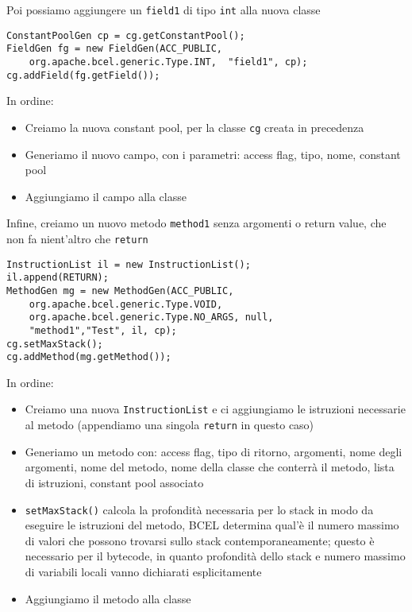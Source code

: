 Poi possiamo aggiungere un \texttt{field1} di tipo \texttt{int} alla nuova classe
\begin{verbatim}
ConstantPoolGen cp = cg.getConstantPool();
FieldGen fg = new FieldGen(ACC_PUBLIC,
    org.apache.bcel.generic.Type.INT,  "field1", cp);
cg.addField(fg.getField());
\end{verbatim}
In ordine:
\begin{itemize}
    \item Creiamo la nuova constant pool, per la classe \texttt{cg} creata in precedenza

    \item Generiamo il nuovo campo, con i parametri: access flag, tipo, nome, constant pool

    \item Aggiungiamo il campo alla classe
\end{itemize}

Infine, creiamo un nuovo metodo \texttt{method1} senza argomenti o return value, che non fa nient'altro che \texttt{return}
\begin{verbatim}
InstructionList il = new InstructionList();
il.append(RETURN);
MethodGen mg = new MethodGen(ACC_PUBLIC,
    org.apache.bcel.generic.Type.VOID,
    org.apache.bcel.generic.Type.NO_ARGS, null,
    "method1","Test", il, cp);
cg.setMaxStack();
cg.addMethod(mg.getMethod());
\end{verbatim}
In ordine:
\begin{itemize}
    \item Creiamo una nuova \texttt{InstructionList} e ci aggiungiamo le istruzioni necessarie al metodo (appendiamo una singola \texttt{return} in questo caso)

    \item Generiamo un metodo con: access flag, tipo di ritorno, argomenti, nome degli argomenti, nome del metodo, nome della classe che conterrà il metodo, lista di istruzioni, constant pool associato

    \item \texttt{setMaxStack()} calcola la profondità necessaria per lo stack in modo da eseguire le istruzioni del metodo, BCEL determina qual'è il numero massimo di valori che possono trovarsi sullo stack contemporaneamente; questo è necessario per il bytecode, in quanto profondità dello stack e numero massimo di variabili locali vanno dichiarati esplicitamente

    \item Aggiungiamo il metodo alla classe
\end{itemize}

